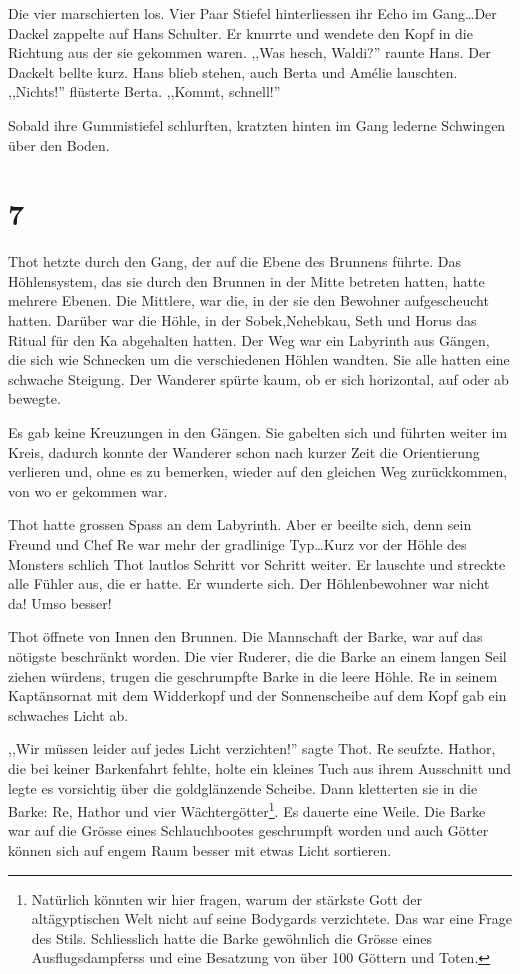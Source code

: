 \documentclass[11pt,titlepage,a5paper]{book}
\newcommand{\am}{Amélie }
\begin{document}
Die vier marschierten los. Vier Paar Stiefel hinterliessen ihr Echo im Gang\dots Der Dackel zappelte auf Hans Schulter. Er knurrte und wendete den Kopf in die Richtung aus der sie gekommen waren. ,,Was hesch, Waldi?'' raunte Hans. Der Dackelt bellte kurz. Hans blieb stehen, auch Berta und \am lauschten. ,,Nichts!'' flüsterte Berta. ,,Kommt, schnell!''

Sobald ihre Gummistiefel schlurften, kratzten hinten im Gang lederne Schwingen über den Boden.

\section*{7}

Thot hetzte durch den Gang, der auf die Ebene des Brunnens führte. Das Höhlensystem, das sie durch den Brunnen in der Mitte betreten hatten, hatte mehrere Ebenen. Die Mittlere, war die, in der sie den Bewohner aufgescheucht hatten. Darüber war die Höhle, in der Sobek,Nehebkau, Seth und Horus das Ritual für den Ka abgehalten hatten. Der Weg war ein Labyrinth aus Gängen, die sich wie Schnecken um die verschiedenen Höhlen wandten. Sie alle hatten eine schwache Steigung. Der Wanderer spürte kaum, ob er sich horizontal, auf oder ab bewegte.

Es gab keine Kreuzungen in den Gängen. Sie gabelten sich und führten weiter im Kreis, dadurch konnte der Wanderer schon nach kurzer Zeit die Orientierung verlieren und, ohne es zu bemerken, wieder auf den gleichen Weg zurückkommen, von wo er gekommen war.

Thot hatte grossen Spass an dem Labyrinth. Aber er beeilte sich, denn sein Freund und Chef Re war mehr der gradlinige Typ\dots Kurz vor der Höhle des Monsters schlich Thot lautlos Schritt vor Schritt weiter. Er lauschte und streckte alle Fühler aus, die er hatte. Er wunderte sich. Der Höhlenbewohner war nicht da! Umso besser!

Thot öffnete von Innen den Brunnen. Die Mannschaft der Barke, war auf das nötigste beschränkt worden. Die vier Ruderer, die die Barke an einem langen Seil ziehen würdens, trugen die geschrumpfte Barke in die leere Höhle. Re in seinem Kaptänsornat mit dem Widderkopf und der Sonnenscheibe auf dem Kopf gab ein schwaches Licht ab. 

,,Wir müssen leider auf jedes Licht verzichten!'' sagte Thot. Re seufzte. Hathor, die bei keiner Barkenfahrt fehlte, holte ein kleines Tuch aus ihrem Ausschnitt und legte es vorsichtig über die goldglänzende Scheibe. Dann kletterten sie in die Barke: Re, Hathor und vier Wächtergötter\footnote{Natürlich könnten wir hier fragen, warum der stärkste Gott der altägyptischen Welt nicht auf seine Bodygards verzichtete. Das war eine Frage des Stils. Schliesslich hatte die Barke gewöhnlich die Grösse eines Ausflugsdampferss und eine Besatzung von über 100 Göttern und Toten.}. Es dauerte eine Weile. Die Barke war auf die Grösse eines Schlauchbootes geschrumpft worden und auch Götter können sich auf engem Raum besser mit etwas Licht sortieren. 
\end{document}
